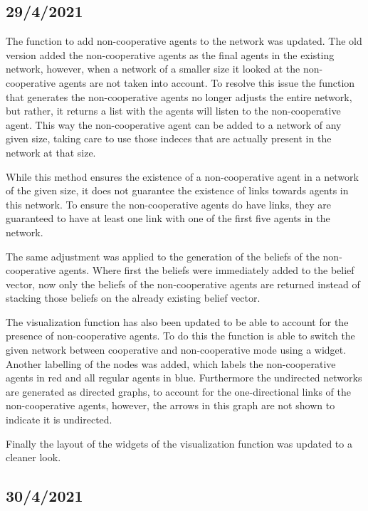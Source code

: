 \documentclass{article}
\begin{document}
\subsection{29/4/2021}

The function to add non-cooperative agents to the network was updated. The old version added the non-cooperative agents as the final agents in the existing network, however, when a network of a smaller size it looked at the non-cooperative agents are not taken into account. To resolve this issue the function that generates the non-cooperative agents no longer adjusts the entire network, but rather, it returns a list with the agents will listen to the non-cooperative agent. This way the non-cooperative agent can be added to a network of any given size, taking care to use those indeces that are actually present in the network at that size.

While this method ensures the existence of a non-cooperative agent in a network of the given size, it does not guarantee the existence of links towards agents in this network. To ensure the non-cooperative agents do have links, they are guaranteed to have at least one link with one of the first five agents in the network.

The same adjustment was applied to the generation of the beliefs of the non-cooperative agents. Where first the beliefs were immediately added to the belief vector, now only the beliefs of the non-cooperative agents are returned instead of stacking those beliefs on the already existing belief vector.

The visualization function has also been updated to be able to account for the presence of non-cooperative agents. To do this the function is able to switch the given network between cooperative and non-cooperative mode using a widget. Another labelling of the nodes was added, which labels the non-cooperative agents in red and all regular agents in blue.
Furthermore the undirected networks are generated as directed graphs, to account for the one-directional links of the non-cooperative agents, however, the arrows in this graph are not shown to indicate it is undirected. 

Finally the layout of the widgets of the visualization function was updated to a cleaner look.

\subsection{30/4/2021}
\end{document}
